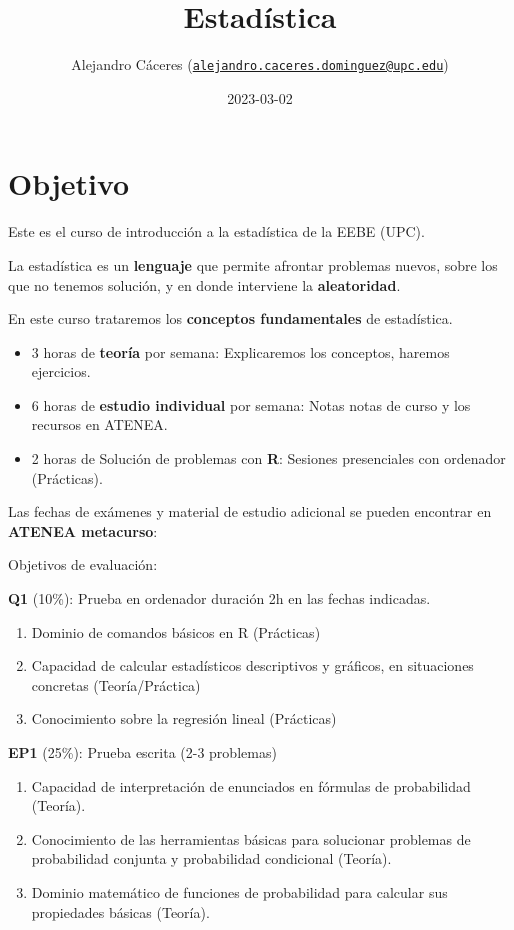 \documentclass[
]{book}
\title{Estadística}
\author{Alejandro Cáceres (\href{mailto:alejandro.caceres.dominguez@upc.edu}{\nolinkurl{alejandro.caceres.dominguez@upc.edu}})}
\date{2023-03-02}
\providecommand{\tightlist}{%
  \setlength{\itemsep}{0pt}\setlength{\parskip}{0pt}}
\begin{document}
\maketitle

{
\setcounter{tocdepth}{1}
\tableofcontents
}
\hypertarget{objetivo}{%
\chapter{Objetivo}\label{objetivo}}

Este es el curso de introducción a la estadística de la EEBE (UPC).

La estadística es un \textbf{lenguaje} que permite afrontar problemas nuevos, sobre los que no tenemos solución, y en donde interviene la \textbf{aleatoridad}.

En este curso trataremos los \textbf{conceptos fundamentales} de estadística.

\begin{itemize}
\item
  3 horas de \textbf{teoría} por semana: Explicaremos los conceptos, haremos ejercicios.
\item
  6 horas de \textbf{estudio individual} por semana: Notas notas de curso y los recursos en ATENEA.
\item
  2 horas de Solución de problemas con \textbf{R}: Sesiones presenciales con ordenador (Prácticas).
\end{itemize}

Las fechas de exámenes y material de estudio adicional se pueden encontrar en \textbf{ATENEA metacurso}:

Objetivos de evaluación:

\textbf{Q1} (10\%): Prueba en ordenador duración 2h en las fechas indicadas.

\begin{enumerate}
\def\labelenumi{\alph{enumi}.}
\tightlist
\item
  Dominio de comandos básicos en R (Prácticas)
\item
  Capacidad de calcular estadísticos descriptivos y gráficos, en situaciones concretas (Teoría/Práctica)
\item
  Conocimiento sobre la regresión lineal (Prácticas)
\end{enumerate}

\textbf{EP1} (25\%): Prueba escrita (2-3 problemas)

\begin{enumerate}
\def\labelenumi{\alph{enumi}.}
\tightlist
\item
  Capacidad de interpretación de enunciados en fórmulas de probabilidad (Teoría).
\item
  Conocimiento de las herramientas básicas para solucionar problemas de probabilidad conjunta y probabilidad condicional (Teoría).
\item
  Dominio matemático de funciones de probabilidad para calcular sus propiedades básicas (Teoría).
\end{enumerate}
\end{document}
